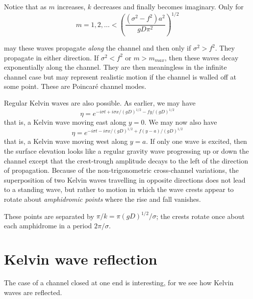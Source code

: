 Notice that as $m$ increases, $k$ decreases and finally becomes imaginary. Only for
\[
	m=1,2,\ldots<
	\left(\frac{(\sigma^2-f^2)a^2}{gD\pi^2}\right)^{1/2}
\]

\sourcepagebreak

may these waves propagate \emph{along} the channel and then only if
$\sigma^2>f^2$. They propagate in either direction. If $\sigma^2<f^2$ or
$m>m_{max}$, then these waves decay exponentially along the channel. They are then
meaningless in the infinite channel case but may represent realistic motion if the
channel is walled off at some point. These are Poincaré channel modes.

Regular Kelvin waves are also possible. As earlier, we may have
\[
	\eta=e^{-i\sigma t+i\sigma x/(gD)^{1/2}-fy/(gD)^{1/2}}
\]
that is, a Kelvin wave moving east along $y=0$. We may now also have
\[
	\eta=e^{-i\sigma t-i\sigma x/(gD)^{1/2}+f(y-a)/(gD)^{1/2}}
\]
that is, a Kelvin wave moving west along $y=a$. If only one wave is excited, then the
surface elevation looks like a regular gravity wave progressing up or down the channel
except that the crest-trough amplitude decays to the left of the direction of
propagation. Because of the non-trigonometric cross-channel variations, the
superposition of two Kelvin waves travelling in opposite directions does not lead to a
standing wave, but rather to motion in which the wave crests appear to rotate about
\emph{amphidromic points} where the rise and fall vanishes.


These points are separated by
$\pi/k=\pi(gD)^{1/2}/\sigma$; the crests rotate once about each amphidrome in a
period $2\pi/\sigma$.

\sourcepagebreak

\section{Kelvin wave reflection}

The case of a channel closed at one end is interesting, for we see how Kelvin waves are
reflected.

